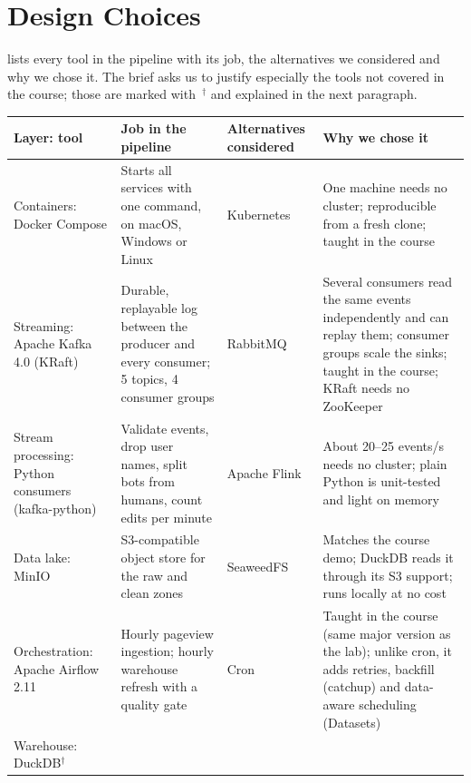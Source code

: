 \section{Design Choices}\label{sec:design}

 lists every tool in the pipeline with its job, the alternatives we considered and why
we chose it. The brief asks us to justify especially the tools not covered in the course; those are
marked with~$^\dagger$ and explained in the next paragraph.

\begin{table}[!htbp]
\centering
\footnotesize
\renewcommand{\arraystretch}{1.25}
\begin{tabularx}{\textwidth}{@{}>{\raggedright\arraybackslash}p{2.6cm}
    >{\raggedright\arraybackslash}X >{\raggedright\arraybackslash}p{3.1cm} >{\raggedright\arraybackslash}X@{}}
\toprule
\textbf{Layer: tool} & \textbf{Job in the pipeline} & \textbf{Alternatives considered} & \textbf{Why we chose it} \\
\midrule
Containers: Docker Compose
  & Starts all services with one command, on macOS, Windows or Linux
  & Kubernetes
  & One machine needs no cluster; reproducible from a fresh clone; taught in the course \\
Streaming: Apache Kafka 4.0 (KRaft)
  & Durable, replayable log between the producer and every consumer; 5 topics, 4 consumer groups
  & RabbitMQ
  & Several consumers read the same events independently and can replay them; consumer groups scale
    the sinks; taught in the course; KRaft needs no ZooKeeper \\
Stream processing: Python consumers (kafka-python)
  & Validate events, drop user names, split bots from humans, count edits per minute
  & Apache Flink
  & About 20--25 events/s needs no cluster; plain Python is unit-tested and light on memory \\
Data lake: MinIO
  & S3-compatible object store for the raw and clean zones
  & SeaweedFS
  & Matches the course demo; DuckDB reads it through its S3 support; runs locally at no cost \\
Orchestration: Apache Airflow 2.11
  & Hourly pageview ingestion; hourly warehouse refresh with a quality gate
  & Cron
  & Taught in the course (same major version as the lab); unlike cron, it adds retries, backfill
    (catchup) and data-aware scheduling (Datasets) \\
Warehouse: DuckDB$^\dagger$

\end{tabularx}
\end{table}
